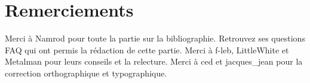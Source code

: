 \thispagestyle{empty}
\chapter*{Remerciements}
Merci à Namrod pour toute la partie sur la bibliographie. Retrouvez ses questions FAQ qui ont permis la rédaction de cette partie.
\noindent Merci à f-leb, LittleWhite et Metalman pour leurs conseils et la relecture.
\noindent Merci à ced et jacques\_jean pour la correction orthographique et typographique.
